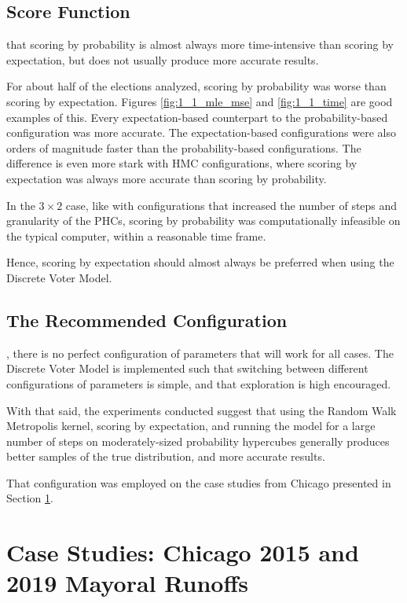 \subsection{Score Function}

 that scoring by probability is almost always more time-intensive than scoring by expectation, but does not usually produce more accurate results.

For about half of the elections analyzed, scoring by probability was worse than scoring by expectation. Figures \ref{fig:1_1_mle_mse} and \ref{fig:1_1_time} are good examples of this. Every expectation-based counterpart to the probability-based configuration was more accurate. The expectation-based configurations were also orders of magnitude faster than the probability-based configurations. The difference is even more stark with HMC configurations, where scoring by expectation was always more accurate than scoring by probability.

In the $3 \times 2$ case, like with configurations that increased the number of steps and granularity of the PHCs, scoring by probability was computationally infeasible on the typical computer, within a reasonable time frame.

Hence, scoring by expectation should almost always be preferred when using the Discrete Voter Model.


\subsection{The Recommended Configuration}

, there is no perfect configuration of parameters that will work for all cases. The Discrete Voter Model is implemented such that switching between different configurations of parameters is simple, and that exploration is high encouraged.

With that said, the experiments conducted suggest that using the Random Walk Metropolis kernel, scoring by expectation, and running the model for a large number of steps on moderately-sized probability hypercubes generally produces better samples of the true distribution, and more accurate results.

That configuration was employed on the case studies from Chicago presented in Section \ref{sec:chicago}.


\section{Case Studies: Chicago 2015 and 2019 Mayoral Runoffs}
\label{sec:chicago}

